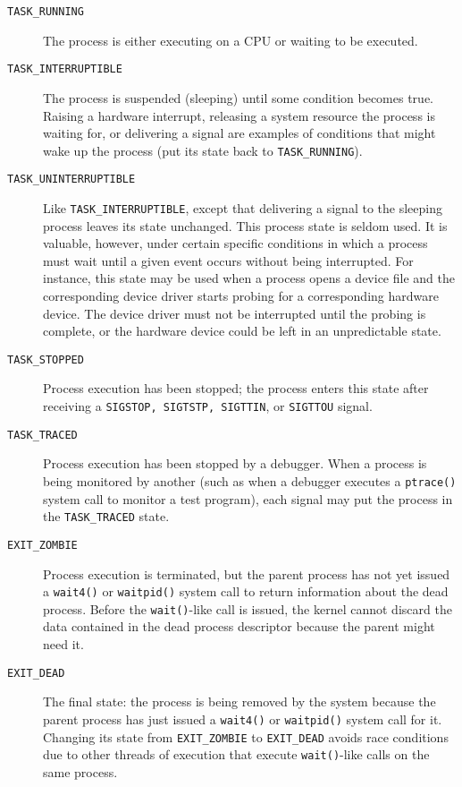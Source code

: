 \begin{description}
\item[\texttt{TASK\_RUNNING}] The process is either executing on a CPU or waiting to be
  executed.
\item[\texttt{TASK\_INTERRUPTIBLE}] The process is suspended (sleeping) until some condition
  becomes true. Raising a hardware interrupt, releasing a system resource the process is
  waiting for, or delivering a signal are examples of conditions that might wake up the
  process (put its state back to \texttt{TASK\_RUNNING}).
\item[\texttt{TASK\_UNINTERRUPTIBLE}] Like \texttt{TASK\_INTERRUPTIBLE}, except that
  delivering a signal to the sleeping process leaves its state unchanged. This process
  state is seldom used. It is valuable, however, under certain specific conditions in
  which a process must wait until a given event occurs without being interrupted. For
  instance, this state may be used when a process opens a device file and the
  corresponding device driver starts probing for a corresponding hardware device. The
  device driver must not be interrupted until the probing is complete, or the hardware
  device could be left in an unpredictable state.
\item[\texttt{TASK\_STOPPED}] Process execution has been stopped; the process enters this
  state after receiving a \texttt{SIGSTOP, SIGTSTP, SIGTTIN}, or
  \texttt{SIGTTOU} signal.
\item[\texttt{TASK\_TRACED}] Process execution has been stopped by a debugger. When a
  process is being monitored by another (such as when a debugger executes a
  \texttt{ptrace()} system call to monitor a test program), each signal may put the process
  in the \texttt{TASK\_TRACED} state.
\item[\texttt{EXIT\_ZOMBIE}] Process execution is terminated, but the parent process has not
  yet issued a \texttt{wait4()} or \texttt{waitpid()} system call to return information about
  the dead process. Before the \texttt{wait()}-like call is issued, the kernel cannot
  discard the data contained in the dead process descriptor because the parent might need
  it.
\item[\texttt{EXIT\_DEAD}] The final state: the process is being removed by the system
  because the parent process has just issued a \texttt{wait4()} or \texttt{waitpid()} system
  call for it. Changing its state from \texttt{EXIT\_ZOMBIE} to \texttt{EXIT\_DEAD} avoids
  race conditions due to other threads of execution that execute \texttt{wait()}-like calls
  on the same process.
\end{description}

